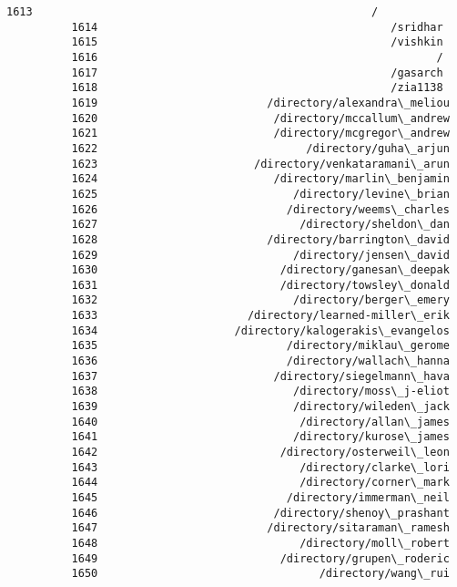 \documentclass[11pt]{article}
\begin{document}
\begin{Verbatim}[commandchars=\\\{\}]
          1613                                                    /
          1614                                             /sridhar
          1615                                             /vishkin
          1616                                                    /
          1617                                             /gasarch
          1618                                             /zia1138
          1619                          /directory/alexandra\_meliou
          1620                           /directory/mccallum\_andrew
          1621                           /directory/mcgregor\_andrew
          1622                                /directory/guha\_arjun
          1623                        /directory/venkataramani\_arun
          1624                           /directory/marlin\_benjamin
          1625                              /directory/levine\_brian
          1626                             /directory/weems\_charles
          1627                               /directory/sheldon\_dan
          1628                          /directory/barrington\_david
          1629                              /directory/jensen\_david
          1630                            /directory/ganesan\_deepak
          1631                            /directory/towsley\_donald
          1632                              /directory/berger\_emery
          1633                       /directory/learned-miller\_erik
          1634                     /directory/kalogerakis\_evangelos
          1635                             /directory/miklau\_gerome
          1636                             /directory/wallach\_hanna
          1637                           /directory/siegelmann\_hava
          1638                              /directory/moss\_j-eliot
          1639                              /directory/wileden\_jack
          1640                               /directory/allan\_james
          1641                              /directory/kurose\_james
          1642                            /directory/osterweil\_leon
          1643                               /directory/clarke\_lori
          1644                               /directory/corner\_mark
          1645                             /directory/immerman\_neil
          1646                           /directory/shenoy\_prashant
          1647                          /directory/sitaraman\_ramesh
          1648                               /directory/moll\_robert
          1649                            /directory/grupen\_roderic
          1650                                  /directory/wang\_rui

\end{Verbatim}
\end{document}
